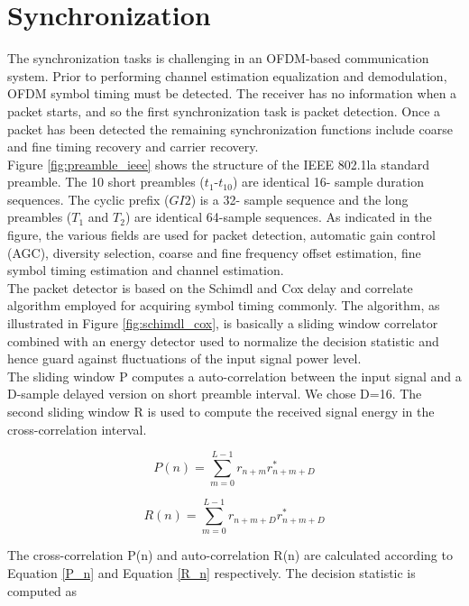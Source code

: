 \section{Synchronization}
\label{section:sync}

The synchronization tasks is challenging in an OFDM-based communication system. Prior to performing channel estimation equalization and demodulation, OFDM symbol timing must be detected. The receiver has no information when a packet starts, and so the first synchronization task is packet detection. Once a packet has been detected the remaining synchronization functions include coarse and fine timing recovery and carrier recovery.\\
Figure \ref{fig:preamble_ieee} shows the structure of the IEEE 802.1la standard preamble. The 10 short preambles ($t_{1}$-$t_{10}$) are identical 16- sample duration sequences. The cyclic prefix ($GI2$) is a 32- sample sequence and the long preambles ($T_{1}$ and $T_{2}$) are identical 64-sample sequences. As indicated in the figure, the various fields are used for packet detection, automatic gain control (AGC), diversity selection, coarse and fine frequency offset estimation, fine symbol timing estimation and channel estimation.\\

The packet detector is based on the Schimdl and Cox delay and correlate algorithm employed for acquiring symbol timing commonly. \cite{sch_cox} The algorithm, as illustrated in Figure \ref{fig:schimdl_cox}, is basically a sliding window correlator combined with an energy detector used to normalize the decision statistic and hence guard against fluctuations of the input signal power level. \cite{dick}\\

The sliding window P computes a auto-correlation between the input signal and a D-sample delayed version on short preamble interval. We chose D=16. The second sliding window R is used to compute the received signal energy in the cross-correlation interval.

\begin{equation} \label{P_n}
P(n) = \sum\limits_{m=0}^{L-1} r_{n+m} r^{*}_{n+m+D}
\end{equation}

\begin{equation} \label{R_n}
 R(n) = \sum\limits_{m=0}^{L-1} r_{n+m+D} r^{*}_{n+m+D}
\end{equation}

The cross-correlation P(n) and auto-correlation R(n) are calculated according to Equation \ref{P_n} and Equation \ref{R_n} respectively. The decision statistic is computed as\\


